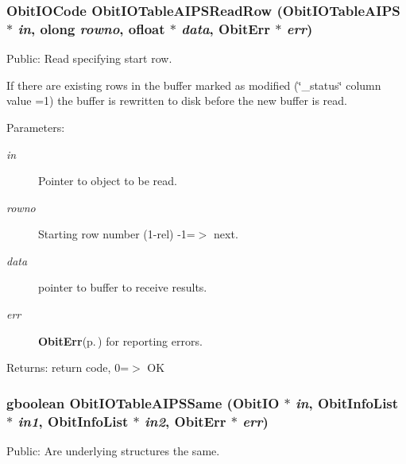 \subsubsection{\setlength{\rightskip}{0pt plus 5cm}Obit\-IOCode Obit\-IOTable\-AIPSRead\-Row ({\bf Obit\-IOTable\-AIPS} $\ast$ {\em in}, {\bf olong} {\em rowno}, {\bf ofloat} $\ast$ {\em data}, {\bf Obit\-Err} $\ast$ {\em err})}\label{ObitIOTableAIPS_8h_a13}


Public: Read specifying start row. 

If there are existing rows in the buffer marked as modified (\char`\"{}\_\-status\char`\"{} column value =1) the buffer is rewritten to disk before the new buffer is read. \begin{Desc}
\item[Parameters:]
\begin{description}
\item[{\em in}]Pointer to object to be read. \item[{\em rowno}]Starting row number (1-rel) -1=$>$ next. \item[{\em data}]pointer to buffer to receive results. \item[{\em err}]{\bf Obit\-Err}{\rm (p.\,\pageref{structObitErr})} for reporting errors. \end{description}
\end{Desc}
\begin{Desc}
\item[Returns:]return code, 0=$>$ OK \end{Desc}
\subsubsection{\setlength{\rightskip}{0pt plus 5cm}gboolean Obit\-IOTable\-AIPSSame ({\bf Obit\-IO} $\ast$ {\em in}, {\bf Obit\-Info\-List} $\ast$ {\em in1}, {\bf Obit\-Info\-List} $\ast$ {\em in2}, {\bf Obit\-Err} $\ast$ {\em err})}\label{ObitIOTableAIPS_8h_a6}


Public: Are underlying structures the same. 

